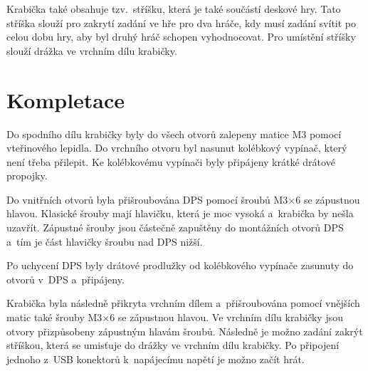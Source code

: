 Krabička také obsahuje tzv.~stříšku, která je také součástí deskové hry. Tato stříška slouží pro zakrytí zadání ve hře pro dva hráče, kdy 
musí zadání svítit po celou dobu hry, aby byl druhý hráč schopen vyhodnocovat. Pro umístění stříšky slouží drážka ve vrchním dílu krabičky.


\chapter{Kompletace} 
Do spodního dílu krabičky byly do všech otvorů zalepeny matice M3 pomocí vteřinového lepidla. Do vrchního otvoru byl nasunut kolébkový vypínač, který
není třeba přilepit. Ke kolébkovému vypínači byly připájeny krátké drátové propojky.  

Do vnitřních otvorů byla přišroubována DPS pomocí šroubů M3$\times$6 se zápustnou hlavou. Klasické šrouby mají hlavičku, která je moc vysoká a~krabička 
by nešla uzavřít. Zápustné šrouby jsou částečně zapuštěny do montážních otvorů DPS a~tím je část hlavičky šroubu nad DPS nižší. 

Po uchycení DPS byly drátové prodlužky od kolébkového vypínače zasunuty do otvorů v~DPS a~připájeny.

Krabička byla následně přikryta vrchním dílem a~přišroubována pomocí vnějších matic také šrouby M3$\times$6 se zápustnou hlavou. Ve vrchním dílu krabičky 
jsou otvory přizpůsobeny zápustným hlavám šroubů. Následně je možno zadání zakrýt stříškou, která se umisťuje do drážky ve vrchním dílu krabičky.
Po připojení jednoho z~USB konektorů k~napájecímu napětí je možno začít hrát.  
